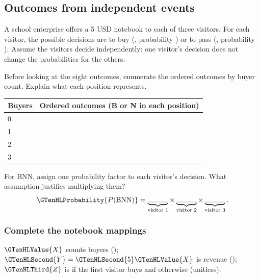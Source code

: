 \subsection{Outcomes from independent events}
\label{subsec:t2-c1-independent-outcomes}

A school enterprise offers a 5 USD notebook to each of three visitors. For each visitor, the possible decisions are to buy (, probability ) or to pass (, probability ). Assume the visitors decide independently: one visitor's decision does not change the probabilities for the others.

\par\medskip\noindent{} Before looking at the eight outcomes, enumerate the ordered outcomes by buyer count. Explain what each position represents.
\begin{center}
\begin{tabularx}{\linewidth}{@{}lX@{}}
\toprule
Buyers & Ordered outcomes (B or N in each position) \\
\midrule
0 & \rule{0pt}{1.5em} \\
1 & \rule{0pt}{1.5em} \\
2 & \rule{0pt}{1.5em} \\
3 & \rule{0pt}{1.5em} \\
\bottomrule
\end{tabularx}
\end{center}
For BNN, assign one probability factor to each visitor's decision. What assumption justifies multiplying them?
\[
\GTenHLProbability{P(\mathrm{BNN})}=\underbrace{\rule{1cm}{0.2pt}}_{\text{visitor 1}}
\times\underbrace{\rule{1cm}{0.2pt}}_{\text{visitor 2}}
\times\underbrace{\rule{1cm}{0.2pt}}_{\text{visitor 3}}.
\]
\subsubsection*{Complete the notebook mappings}
$\GTenHLValue{X}$ counts buyers (); $\GTenHLSecond{Y}=\GTenHLSecond{5}\GTenHLValue{X}$ is revenue (); $\GTenHLThird{Z}$ is  if the first visitor buys and  otherwise (unitless).

